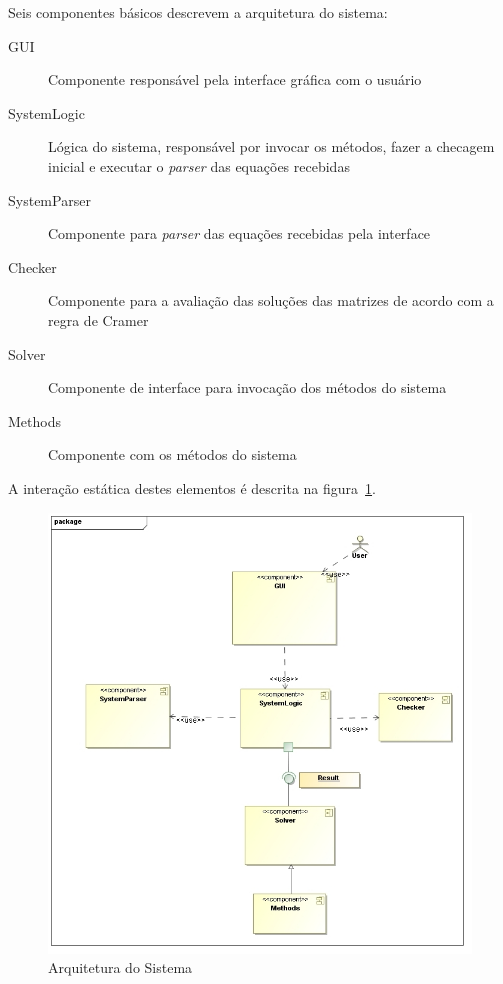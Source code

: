\documentclass[a4paper,10pt]{report}
\begin{document}
Seis componentes básicos descrevem a arquitetura do sistema:
\begin{description}
 \item[GUI] Componente responsável pela interface gráfica com o usuário
 \item[SystemLogic] Lógica do sistema, responsável por invocar os métodos, fazer a checagem inicial e executar o \textit{parser} das equações recebidas
 \item[SystemParser] Componente para \textit{parser} das equações recebidas pela interface
 \item[Checker] Componente para a avaliação das soluções das matrizes de acordo com a regra de Cramer
 \item[Solver] Componente de interface para invocação dos métodos do sistema
 \item[Methods] Componente com os métodos do sistema
 \end{description}

A interação estática destes elementos é descrita na figura~\ref{fig:arquitetura}.

\begin{figure}[ht]
 \centering
 \includegraphics[width=\textwidth]{MSN1}
 \caption{Arquitetura do Sistema}
 \label{fig:arquitetura}
\end{figure}
\end{document}
